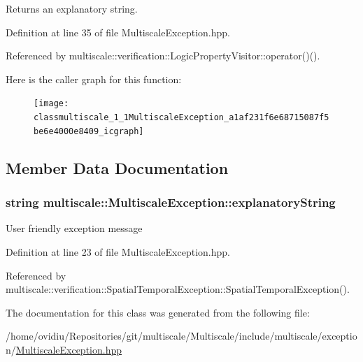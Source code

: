 \-Returns an explanatory string. 



\-Definition at line 35 of file \-Multiscale\-Exception.\-hpp.



\-Referenced by multiscale\-::verification\-::\-Logic\-Property\-Visitor\-::operator()().



\-Here is the caller graph for this function\-:
\nopagebreak
\begin{figure}[H]
\begin{center}
\leavevmode
\texttt{[image: classmultiscale\_1\_1MultiscaleException\_a1af231f6e68715087f5be6e4000e8409\_icgraph]}
\end{center}
\end{figure}




\subsection{\-Member \-Data \-Documentation}
\hypertarget{classmultiscale_1_1MultiscaleException_acf3042077605955cbb36a4472ed80233}{
\subsubsection[{explanatory\-String}]{\setlength{\rightskip}{0pt plus 5cm}string {\bf multiscale\-::\-Multiscale\-Exception\-::explanatory\-String}}}\label{classmultiscale_1_1MultiscaleException_acf3042077605955cbb36a4472ed80233}
\-User friendly exception message 

\-Definition at line 23 of file \-Multiscale\-Exception.\-hpp.



\-Referenced by multiscale\-::verification\-::\-Spatial\-Temporal\-Exception\-::\-Spatial\-Temporal\-Exception().



\-The documentation for this class was generated from the following file\-:\begin{DoxyCompactItemize}
\item 
/home/ovidiu/\-Repositories/git/multiscale/\-Multiscale/include/multiscale/exception/\hyperlink{MultiscaleException_8hpp}{\-Multiscale\-Exception.\-hpp}\end{DoxyCompactItemize}

